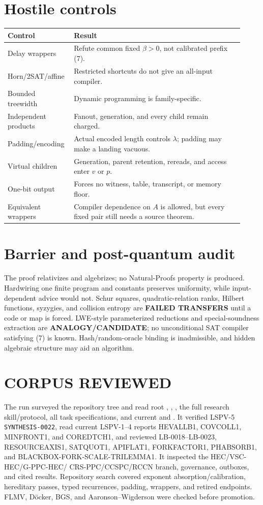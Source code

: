 \documentclass[11pt]{article}
\begin{document}
\section{Hostile controls}
\begin{longtable}{p{0.23\linewidth}p{0.69\linewidth}}
\toprule Control & Result\\ \midrule
Delay wrappers & Refute common fixed $\beta>0$, not calibrated prefix (7).\\
Horn/2SAT/affine & Restricted shortcuts do not give an all-input compiler.\\
Bounded treewidth & Dynamic programming is family-specific.\\
Independent products & Fanout, generation, and every child remain charged.\\
Padding/encoding & Actual encoded length controls $\lambda$; padding may make a landing vacuous.\\
Virtual children & Generation, parent retention, rereads, and access enter $v$ or $p$.\\
One-bit output & Forces no witness, table, transcript, or memory floor.\\
Equivalent wrappers & Compiler dependence on $A$ is allowed, but every fixed pair still needs a source theorem.\\
\bottomrule
\end{longtable}

\section{Barrier and post-quantum audit}
The proof relativizes and algebrizes; no Natural-Proofs property is produced.
Hardwiring one finite program and constants preserves uniformity, while
input-dependent advice would not. Schur squares, quadratic-relation ranks,
Hilbert functions, syzygies, and collision entropy are \textbf{FAILED
TRANSFERS} until a code or map is forced. LWE-style parameterized reductions
and special-soundness extraction are \textbf{ANALOGY/CANDIDATE}; no
unconditional SAT compiler satisfying (7) is known. Hash/random-oracle
binding is inadmissible, and hidden algebraic structure may aid an algorithm.

\section{CORPUS REVIEWED}
The run surveyed the repository tree and read root ,
, , the full research skill/protocol, all task
specifications, and current  and . It verified
LSPV-5 \texttt{SYNTHESIS-0022}, read current LSPV-1--4 reports HEVALLB1,
COVCOLL1, MINFRONT1, and COREDTCH1, and reviewed LB-0018--LB-0023,
RESOURCEAXIS1, SATQUOT1, APIFLAT1, FORKFACTOR1, PHABSORB1, and
BLACKBOX-FORK-SCALE-TRILEMMA1. It inspected the HEC/VSC-HEC/G-PPC-HEC/
CRS-PPC/CCSPC/RCCN branch, governance, outboxes, and cited results.
Repository search covered exponent absorption/calibration, hereditary passes,
typed recurrences, padding, wrappers, and retired endpoints. FLMV, D\"ocker,
BGS, and Aaronson--Wigderson were checked before promotion.
\end{document}
